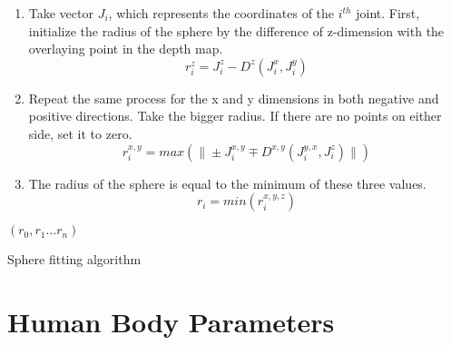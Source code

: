 \begin{enumerate}
\item Take vector $J_i$, which represents the coordinates of the $i^{th}$
joint.
First, initialize the radius of the sphere by the difference of z-dimension with the overlaying point in the depth map.
\begin{equation}
r_i^z=J_i^z-D^z(J_i^x,J_i^y)
\label{eqn:z_sphere_radius}
\end{equation}
\item Repeat the same process for the x and y dimensions in both negative and positive directions. Take the bigger radius. If there are no points on either side, set it to zero.
\begin{equation}
r_i^{x,y}=max(\| \pm J_i^{x,y} \mp D^{x,y}(J_i^{y,x},J_i^z)\|)
\label{eqn:x_y_sphere_radius}
\end{equation}
\item The radius of the sphere is equal to the minimum of these three values.
\begin{equation}
r_i=min(r_i^{x,y,z})
\label{eqn:minimum_sphere-radius}
\end{equation}
\end{enumerate}

\begin{algorithm}[ht]
\DontPrintSemicolon %
\Return $(r_0,r_1 \ldots r_n)$ 
\caption{Sphere fitting algorithm}
\label{algo:sphere_fitting}
\end{algorithm}

\section{Human Body Parameters}
\label{section_human_body_parameters}

